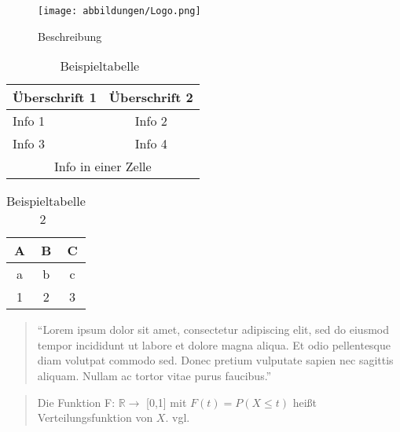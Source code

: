 \begin{figure}[!ht]
	\centering
	\texttt{[image: abbildungen/Logo.png]}
	\caption[Beschreibung]{Beschreibung~\cite[S.14]{mf2005}}
       \label{fig:Beschreibung}
\end{figure}


\begin{table}[!ht]
	\centering
	  \caption[Beispieltabelle]{Beispieltabelle~\cite[S.400]{KnutThea2009}}
	  \label{Beispieltabelle}
	  \begin{tabular}{ | l | c | }
	    \hline
	    Überschrift 1 & Überschrift 2 \\ \hline 
	    Info 1 & Info 2 \\ \hline
	    Info 3 & Info 4 \\ \hline
	    \hline
	    \multicolumn{2}{|c|}{Info in einer Zelle} \\
	    \hline
	  \end{tabular}
\end{table}

\begin{table}[!ht]
	\centering
	\caption[Beispieltabelle 2]{Beispieltabelle 2~\cite[S.700]{mf2005}}
	\label{Beispieltabelle_2}
      \begin{tabular}{ccc}\toprule
	A&B&C \\ \midrule
	a&b&c \\ \cmidrule{1-3}
	1&2&3\\ \bottomrule
	\end{tabular}
\end{table}

\begin{quote}
	\singlespacing \small
	"`Lorem ipsum dolor sit amet, consectetur adipiscing elit, sed do eiusmod tempor incididunt ut labore et dolore magna aliqua. 
	Et odio pellentesque diam volutpat commodo sed. Donec pretium vulputate sapien nec sagittis aliquam. Nullam ac tortor vitae 
	purus faucibus."'~\cite[S. 189]{KnutThea2009}
\end{quote}

\begin{quote}
	Die Funktion F: $\mathbb{R} \rightarrow$ [0,1] mit $F(t) = P (X \le t)$ heißt Verteilungsfunktion von $X$. vgl. \cite[S.55]{mf2005}
\end{quote}

